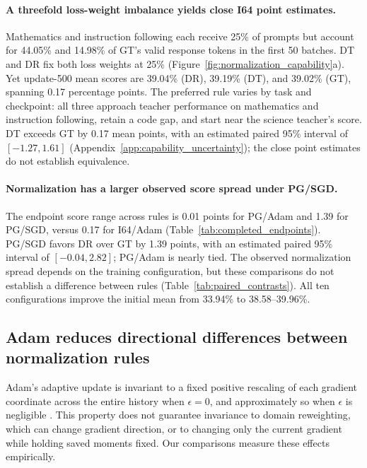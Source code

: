 \paragraph{A threefold loss-weight imbalance yields close I64 point estimates.}
Mathematics and instruction following each receive 25\% of prompts but account for 44.05\% and 14.98\% of GT's valid response tokens in the first 50 batches. DT and DR fix both loss weights at 25\% (Figure~\ref{fig:normalization_capability}a). Yet update-500 mean scores are 39.04\% (DR), 39.19\% (DT), and 39.02\% (GT), spanning 0.17 percentage points. The preferred rule varies by task and checkpoint: all three approach teacher performance on mathematics and instruction following, retain a code gap, and start near the science teacher's score. DT exceeds GT by 0.17 mean points, with an estimated paired 95\% interval of $[-1.27,1.61]$ (Appendix~\ref{app:capability_uncertainty}); the close point estimates do not establish equivalence.



\paragraph{Normalization has a larger observed score spread under PG/SGD.}
The endpoint score range across rules is 0.01 points for PG/Adam and 1.39 for PG/SGD, versus 0.17 for I64/Adam (Table~\ref{tab:completed_endpoints}). PG/SGD favors DR over GT by 1.39 points, with an estimated paired 95\% interval of $[-0.04,2.82]$; PG/Adam is nearly tied. The observed normalization spread depends on the training configuration, but these comparisons do not establish a difference between rules (Table~\ref{tab:paired_contrasts}). All ten configurations improve the initial mean from 33.94\% to 38.58--39.96\%.



\subsection{Adam reduces directional differences between normalization rules}

Adam's adaptive update is invariant to a fixed positive rescaling of each gradient coordinate across the entire history when $\epsilon=0$, and approximately so when $\epsilon$ is negligible \citep{kingma2015adam}. This property does not guarantee invariance to domain reweighting, which can change gradient direction, or to changing only the current gradient while holding saved moments fixed. Our comparisons measure these effects empirically.


